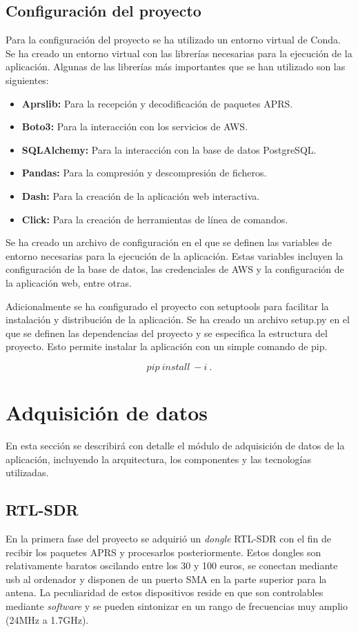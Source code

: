 \subsection{Configuración del proyecto}

Para la configuración del proyecto se ha utilizado un entorno virtual de Conda. Se ha creado un entorno virtual con las librerías necesarias para la ejecución de la aplicación. Algunas de las librerías más importantes que se han utilizado son las siguientes:

\begin{itemize}
	\item \textbf{Aprslib:} Para la recepción y decodificación de paquetes APRS.
	\item \textbf{Boto3:} Para la interacción con los servicios de AWS.
	\item \textbf{SQLAlchemy:} Para la interacción con la base de datos PostgreSQL.
	\item \textbf{Pandas:} Para la compresión y descompresión de ficheros.
	\item \textbf{Dash:} Para la creación de la aplicación web interactiva.
	\item \textbf{Click:} Para la creación de herramientas de línea de comandos.
\end{itemize}

Se ha creado un archivo de configuración en el que se definen las variables de entorno necesarias para la ejecución de la aplicación. Estas variables incluyen la configuración de la base de datos, las credenciales de AWS y la configuración de la aplicación web, entre otras.

Adicionalmente se ha configurado el proyecto con setuptools para facilitar la instalación y distribución de la aplicación. Se ha creado un archivo setup.py en el que se definen las dependencias del proyecto y se especifica la estructura del proyecto. Esto permite instalar la aplicación con un simple comando de pip.

$$pip\ install\ -i\ .$$

\section{Adquisición de datos}
En esta sección se describirá con detalle el módulo de adquisición de datos de la aplicación, incluyendo la arquitectura, los componentes y las tecnologías utilizadas.

\subsection{RTL-SDR}
En la primera fase del proyecto se adquirió un \textit{dongle} RTL-SDR con el fin de recibir los paquetes APRS y procesarlos posteriormente. Estos dongles son relativamente baratos oscilando entre los 30 y 100 euros, se conectan mediante usb al ordenador y disponen de un puerto SMA en la parte superior para la antena. La peculiaridad de estos dispositivos reside en que son controlables mediante \textit{software} y se pueden sintonizar en un rango de frecuencias muy amplio (24MHz a 1.7GHz).

